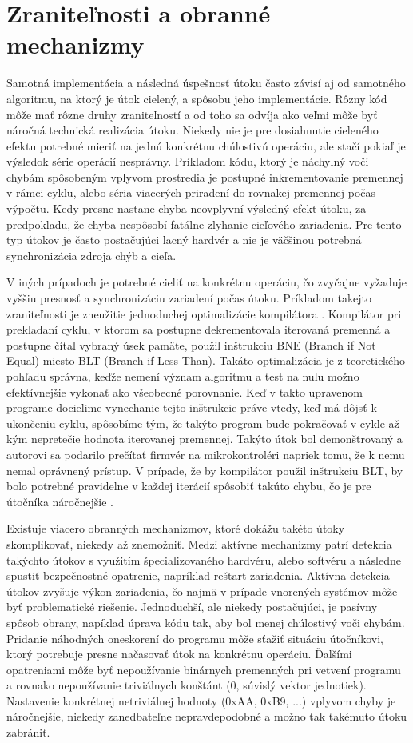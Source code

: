 \section{Zraniteľnosti a obranné mechanizmy}
Samotná implementácia a následná úspešnosť útoku často závisí aj od samotného algoritmu, na ktorý je útok cielený, a spôsobu jeho implementácie. Rôzny kód môže mať rôzne druhy zraniteľností a od toho sa odvíja ako veľmi môže byť náročná technická realizácia útoku. Niekedy nie je pre dosiahnutie cieleného efektu potrebné mieriť na jednú konkrétnu chúlostivú operáciu, ale stačí pokiaľ je výsledok série operácií nesprávny. Príkladom kódu, ktorý je náchylný voči chybám spôsobeným vplyvom prostredia je postupné inkrementovanie premennej v rámci cyklu, alebo séria viacerých priradení do rovnakej premennej počas výpočtu. Kedy presne nastane chyba neovplyvní výsledný efekt útoku, za predpokladu, že chyba nespôsobí fatálne zlyhanie cieľového zariadenia. Pre tento typ útokov je často postačujúci lacný hardvér a nie je väčšinou potrebná synchronizácia zdroja chýb a cieľa.

V iných prípadoch je potrebné cieliť na konkrétnu operáciu, čo zvyčajne vyžaduje vyššiu presnosť a synchronizáciu zariadení počas útoku. Príkladom takejto zraniteľnosti je zneužitie jednoduchej optimalizácie kompilátora \cite{AntiFI}. Kompilátor pri prekladaní cyklu, v ktorom sa postupne dekrementovala iterovaná premenná a postupne čítal vybraný úsek pamäte, použil inštrukciu BNE (Branch if Not Equal) miesto BLT (Branch if Less Than). Takáto optimalizácia je z teoretického pohľadu správna, keďže nemení význam algoritmu a test na nulu možno efektívnejšie vykonať ako všeobecné porovnanie. Keď v takto upravenom programe docielime vynechanie tejto inštrukcie práve vtedy, keď má dôjsť k ukončeniu cyklu, spôsobíme tým, že  takýto program bude pokračovať v cykle až kým nepretečie hodnota iterovanej premennej. Takýto útok bol demonštrovaný a autorovi sa podarilo prečítať firmvér na mikrokontroléri napriek tomu, že k nemu nemal oprávnený prístup. V prípade, že by kompilátor použil inštrukciu BLT, by bolo potrebné pravidelne v každej iterácií spôsobiť takúto chybu, čo je pre útočníka náročnejšie \cite{AntiFI}.

Existuje viacero obranných mechanizmov, ktoré dokážu takéto útoky skomplikovať, niekedy až znemožniť. Medzi aktívne mechanizmy patrí detekcia takýchto útokov s využitím špecializovaného hardvéru, alebo softvéru a následne spustiť bezpečnostné opatrenie, napríklad reštart zariadenia. Aktívna detekcia útokov zvyšuje výkon zariadenia, čo najmä v prípade vnorených systémov môže byť problematické riešenie. Jednoduchší, ale niekedy postačujúci, je pasívny spôsob obrany, napíklad úprava kódu tak, aby bol menej chúlostivý voči chybám. Pridanie náhodných oneskorení do programu môže sťažiť situáciu útočníkovi, ktorý potrebuje presne načasovať útok na konkrétnu operáciu. Ďalšími opatreniami môže byť nepoužívanie binárnych premenných pri vetvení programu a rovnako nepoužívanie triviálnych konštánt (0, súvislý vektor jednotiek). Nastavenie konkrétnej netriviálnej hodnoty (0xAA, 0xB9, ...) vplyvom chyby je náročnejšie, niekedy zanedbateľne nepravdepodobné a možno tak takémuto útoku zabrániť.